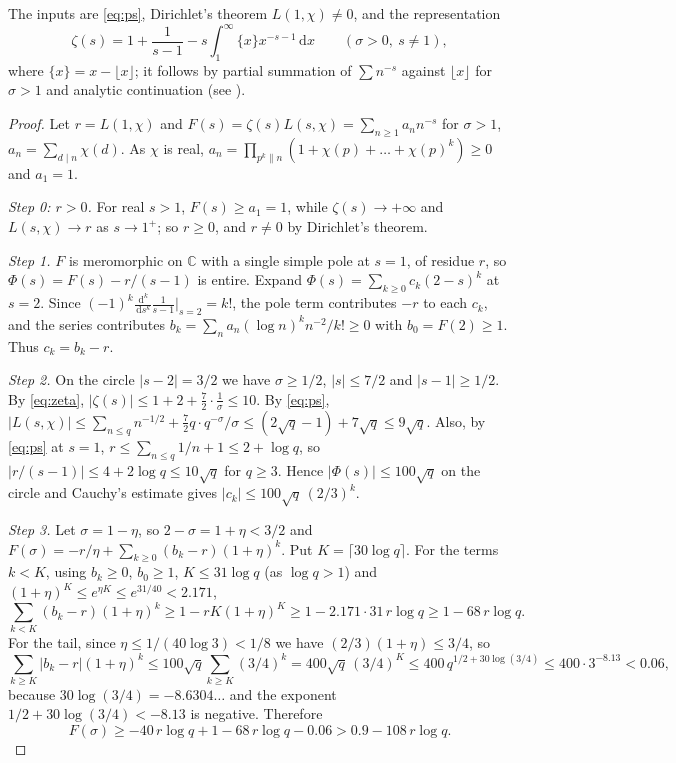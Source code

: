 \documentclass[11pt]{article}
\theoremstyle{definition}
\theoremstyle{remark}
\numberwithin{equation}{section}
\newcommand{\C}{\mathbb C}
\newcommand{\dd}{\,\mathrm{d}}
\begin{document}
The inputs are \eqref{eq:ps}, Dirichlet's theorem $L(1,\chi)\ne0$, and the representation
\begin{equation}\label{eq:zeta}
 \zeta(s)=1+\frac1{s-1}-s\int_1^\infty\{x\}x^{-s-1}\dd x\qquad(\sigma>0,\ s\ne1),
\end{equation}
where $\{x\}=x-\lfloor x\rfloor$; it follows by partial summation of $\sum n^{-s}$ against $\lfloor x\rfloor$ for $\sigma>1$ and analytic continuation (see \cite[Chapter~1]{mv2007}).

\begin{proof}
Let $r=L(1,\chi)$ and $F(s)=\zeta(s)L(s,\chi)=\sum_{n\ge1}a_nn^{-s}$ for $\sigma>1$, $a_n=\sum_{d\mid n}\chi(d)$. As $\chi$ is real, $a_n=\prod_{p^k\parallel n}(1+\chi(p)+\dots+\chi(p)^k)\ge0$ and $a_1=1$.

\emph{Step 0: $r>0$.} For real $s>1$, $F(s)\ge a_1=1$, while $\zeta(s)\to+\infty$ and $L(s,\chi)\to r$ as $s\to1^+$; so $r\ge0$, and $r\ne0$ by Dirichlet's theorem.

\emph{Step 1.} $F$ is meromorphic on $\C$ with a single simple pole at $s=1$, of residue $r$, so $\Phi(s)=F(s)-r/(s-1)$ is entire. Expand $\Phi(s)=\sum_{k\ge0}c_k(2-s)^k$ at $s=2$. Since $(-1)^k\frac{\dd^k}{\dd s^k}\frac1{s-1}\big|_{s=2}=k!$, the pole term contributes $-r$ to each $c_k$, and the series contributes $b_k=\sum_na_n(\log n)^kn^{-2}/k!\ge0$ with $b_0=F(2)\ge1$. Thus $c_k=b_k-r$.

\emph{Step 2.} On the circle $|s-2|=3/2$ we have $\sigma\ge1/2$, $|s|\le7/2$ and $|s-1|\ge1/2$. By \eqref{eq:zeta}, $|\zeta(s)|\le1+2+\tfrac72\cdot\tfrac1\sigma\le10$. By \eqref{eq:ps}, $|L(s,\chi)|\le\sum_{n\le q}n^{-1/2}+\tfrac72q\cdot q^{-\sigma}/\sigma\le(2\sqrt q-1)+7\sqrt q\le9\sqrt q$. Also, by \eqref{eq:ps} at $s=1$, $r\le\sum_{n\le q}1/n+1\le2+\log q$, so $|r/(s-1)|\le4+2\log q\le10\sqrt q$ for $q\ge3$. Hence $|\Phi(s)|\le100\sqrt q$ on the circle and Cauchy's estimate gives $|c_k|\le100\sqrt q\,(2/3)^k$.

\emph{Step 3.} Let $\sigma=1-\eta$, so $2-\sigma=1+\eta<3/2$ and $F(\sigma)=-r/\eta+\sum_{k\ge0}(b_k-r)(1+\eta)^k$. Put $K=\lceil30\log q\rceil$. For the terms $k<K$, using $b_k\ge0$, $b_0\ge1$, $K\le31\log q$ (as $\log q>1$) and $(1+\eta)^K\le e^{\eta K}\le e^{31/40}<2.171$,
\[
 \sum_{k<K}(b_k-r)(1+\eta)^k\ge1-rK(1+\eta)^K\ge1-2.171\cdot31\,r\log q\ge1-68\,r\log q .
\]
For the tail, since $\eta\le1/(40\log3)<1/8$ we have $(2/3)(1+\eta)\le3/4$, so
\[
 \sum_{k\ge K}|b_k-r|(1+\eta)^k\le100\sqrt q\sum_{k\ge K}(3/4)^k=400\sqrt q\,(3/4)^K\le400\,q^{1/2+30\log(3/4)}\le400\cdot3^{-8.13}<0.06,
\]
because $30\log(3/4)=-8.6304\ldots$ and the exponent $1/2+30\log(3/4)<-8.13$ is negative. Therefore
\begin{equation}\label{eq:Fsigma}
 F(\sigma)\ge-40\,r\log q+1-68\,r\log q-0.06>0.9-108\,r\log q .
\end{equation}


\end{proof}
\end{document}
